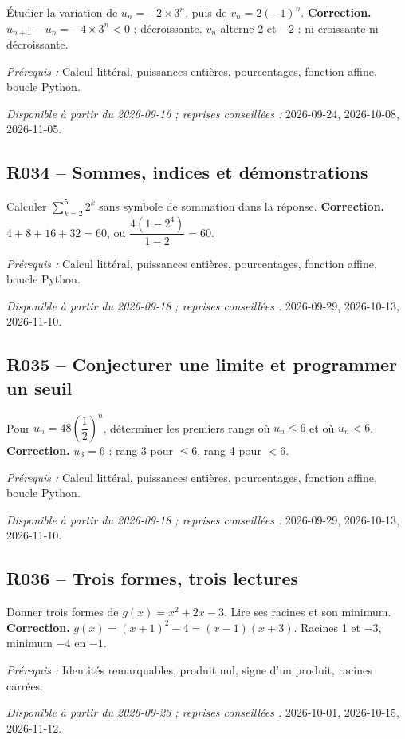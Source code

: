Étudier la variation de $u_n=-2\times3^n$, puis de $v_n=2(-1)^n$.
\ifmxteacher\textbf{Correction.} $u_{n+1}-u_n=-4\times3^n<0$ : décroissante. $v_n$ alterne 2 et $-2$ : ni croissante ni décroissante.\par\textit{Prérequis :} Calcul littéral, puissances entières, pourcentages, fonction affine, boucle Python.\par\textit{Disponible à partir du 2026-09-16 ; reprises conseillées :} 2026-09-24, 2026-10-08, 2026-11-05.\fi
{}\subsection*{R034 -- Sommes, indices et démonstrations}\label{R034}
Calculer $\sum_{k=2}^{5}2^k$ sans symbole de sommation dans la réponse.
\ifmxteacher\textbf{Correction.} $4+8+16+32=60$, ou $\dfrac{4(1-2^4)}{1-2}=60$.\par\textit{Prérequis :} Calcul littéral, puissances entières, pourcentages, fonction affine, boucle Python.\par\textit{Disponible à partir du 2026-09-18 ; reprises conseillées :} 2026-09-29, 2026-10-13, 2026-11-10.\fi
{}\subsection*{R035 -- Conjecturer une limite et programmer un seuil}\label{R035}
Pour $u_n=48(\dfrac{1}{2})^n$, déterminer les premiers rangs où $u_n\leq6$ et où $u_n<6$.
\ifmxteacher\textbf{Correction.} $u_3=6$ : rang 3 pour $\leq6$, rang 4 pour $<6$.\par\textit{Prérequis :} Calcul littéral, puissances entières, pourcentages, fonction affine, boucle Python.\par\textit{Disponible à partir du 2026-09-18 ; reprises conseillées :} 2026-09-29, 2026-10-13, 2026-11-10.\fi
{}\subsection*{R036 -- Trois formes, trois lectures}\label{R036}
Donner trois formes de $g(x)=x^2+2x-3$. Lire ses racines et son minimum.
\ifmxteacher\textbf{Correction.} $g(x)=(x+1)^2-4=(x-1)(x+3)$. Racines 1 et $-3$, minimum $-4$ en $-1$.\par\textit{Prérequis :} Identités remarquables, produit nul, signe d’un produit, racines carrées.\par\textit{Disponible à partir du 2026-09-23 ; reprises conseillées :} 2026-10-01, 2026-10-15, 2026-11-12.\fi
